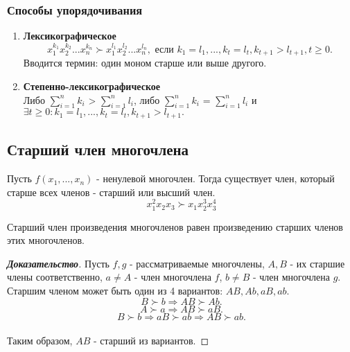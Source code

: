 \documentclass[12pt]{article}
\begin{document}
\subsubsection{Способы упорядочивания}
\begin{enumerate}
\item \textbf{Лексикографическое}
$$x_1^{k_1}x_2^{k_2}...x_n^{k_n} \succ x_1^{l_1}x_2^{l_2}...x_n^{l_n}, \text{ если } k_1 = l_1, ..., k_t = l_t, k_{t+1} > l_{t+1}, t \geq 0.$$
Вводится термин: один моном старше или выше другого.
\item \textbf{Степенно-лексикографическое} \\
Либо $\sum\limits_{i=1}^n k_i$ > $\sum\limits_{i=1}^n l_i$, либо $\sum\limits_{i=1}^n k_i$ = $\sum\limits_{i=1}^n l_i$ и $\exists t \geq 0:  k_1 = l_1, ..., k_t = l_t, k_{t+1} > l_{t+1}.$
\end{enumerate}

\subsection{Старший член многочлена}
\indent \indent Пусть $f(x_1, ..., x_n)$ - ненулевой многочлен. Тогда существует член, который старше всех членов - старший или высший член.
$$x_1^2x_2x_3 \succ x_1x_2^3x_3^4$$
\begin{lem}
Старший член произведения многочленов равен произведению старших членов этих многочленов. 
\end{lem}
\begin{proof}[\textbf{Доказательство}]
Пусть $f, g$ - рассматриваемые многочлены, $A, B$ - их старшие члены соответственно, $a \neq A$ - член многочлена $f$, $b \neq B$ - член многочлена $g$. \\
 \indent Старшим членом может быть один из 4 вариантов: $AB, Ab, aB, ab$.
$$B \succ b \Rightarrow AB \succ Ab.$$
$$A \succ a \Rightarrow AB \succ aB.$$
$$B \succ b \Rightarrow aB \succ ab \Rightarrow AB \succ ab.$$ \\
\indent Таким образом, $AB$ - старший из вариантов.
\end{proof}
\end{document}
